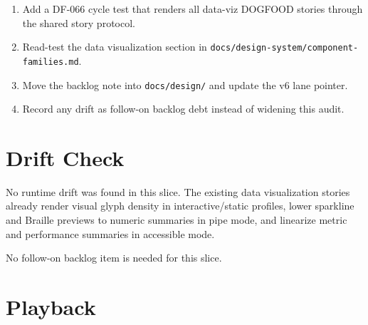 \begin{enumerate}
\def\labelenumi{\arabic{enumi}.}
\tightlist
\item
  Add a DF-066 cycle test that renders all data-viz DOGFOOD stories through the shared story protocol.
\item
  Read-test the data visualization section in \texttt{d\allowbreak{}o\allowbreak{}c\allowbreak{}s\allowbreak{}/\allowbreak{}d\allowbreak{}e\allowbreak{}s\allowbreak{}i\allowbreak{}g\allowbreak{}n\allowbreak{}-\allowbreak{}s\allowbreak{}y\allowbreak{}s\allowbreak{}t\allowbreak{}e\allowbreak{}m\allowbreak{}/\allowbreak{}c\allowbreak{}o\allowbreak{}m\allowbreak{}p\allowbreak{}o\allowbreak{}n\allowbreak{}e\allowbreak{}n\allowbreak{}t\allowbreak{}-\allowbreak{}f\allowbreak{}a\allowbreak{}m\allowbreak{}i\allowbreak{}l\allowbreak{}i\allowbreak{}e\allowbreak{}s\allowbreak{}.\allowbreak{}m\allowbreak{}d}.
\item
  Move the backlog note into \texttt{d\allowbreak{}o\allowbreak{}c\allowbreak{}s\allowbreak{}/\allowbreak{}d\allowbreak{}e\allowbreak{}s\allowbreak{}i\allowbreak{}g\allowbreak{}n\allowbreak{}/} and update the v6 lane pointer.
\item
  Record any drift as follow-on backlog debt instead of widening this audit.
\end{enumerate}

\section{Drift Check}\label{record-107-drift-check}

No runtime drift was found in this slice. The existing data visualization stories already render visual glyph density in interactive/static profiles, lower sparkline and Braille previews to numeric summaries in pipe mode, and linearize metric and performance summaries in accessible mode.

No follow-on backlog item is needed for this slice.

\section{Playback}\label{record-107-playback}

